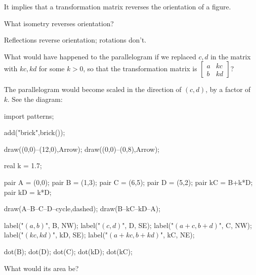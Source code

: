 \documentclass[../key.tex]{subfiles}
\begin{document}
It implies that a transformation matrix reverses the orientation of a figure.

\begin{iinner_problem}
\item What isometry reverses orientation?
\end{iinner_problem}

Reflections reverse orientation; rotations don't.

\begin{inner_problem}
\item
\end{inner_problem}

\begin{iinner_problem}[start=1]
\item What would have happened to the parallelogram if we replaced $c,d$ in the matrix with $kc,kd$ for some $k>0$, so that the transformation matrix is $\left[\begin{smallmatrix} a & kc \\ b & kd \end{smallmatrix}\right]$?
\end{iinner_problem}

The parallelogram would become scaled in the direction of $(c,d)$, by a factor of $k$. See the diagram:

\begin{center}
	\begin{asy}[width=0.4\textwidth]
	import patterns;

	add("brick",brick());

	draw((0,0)--(12,0),Arrow);
	draw((0,0)--(0,8),Arrow);

	real k = 1.7;

	pair A = (0,0);
	pair B = (1,3);
	pair C = (6,5);
	pair D = (5,2);
	pair kC = B+k*D;
	pair kD = k*D;

	draw(A--B--C--D--cycle,dashed);
	draw(B--kC--kD--A);

	label("$(a,b)$", B, NW);
	label("$(c,d)$", D, SE);
	label("$(a+c,b+d)$", C, NW);
	label("$(kc,kd)$", kD, SE);
	label("$(a+kc,b+kd)$", kC, NE);

	dot(B);
	dot(D);
	dot(C);
	dot(kD);
	dot(kC);

	\end{asy}
\end{center}

\begin{iinner_problem}
\item What would its area be?
\end{iinner_problem}
\end{document}

